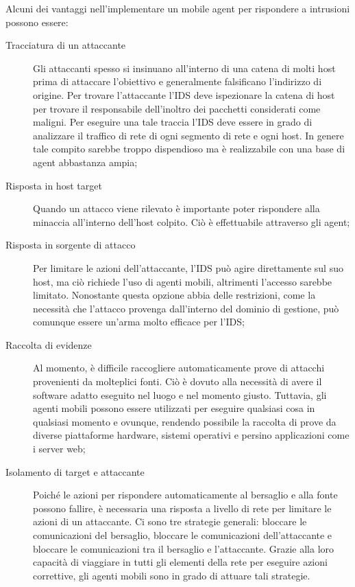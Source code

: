 Alcuni dei vantaggi nell'implementare un mobile agent per rispondere a intrusioni possono essere:
\begin{description}
    \item [Tracciatura di un attaccante] Gli attaccanti spesso si insinuano all'interno di una catena di molti host prima di attaccare l'obiettivo e generalmente falsificano l'indirizzo di origine. Per trovare l'attaccante l'IDS deve ispezionare la catena di host per trovare il responsabile dell'inoltro dei pacchetti considerati come maligni. Per eseguire una tale traccia l'IDS deve essere in grado di analizzare il traffico di rete di ogni segmento di rete e ogni host. In genere tale compito sarebbe troppo dispendioso ma è realizzabile  con una base di agent abbastanza ampia;
    \item [Risposta in host target] Quando un attacco viene rilevato è importante poter rispondere alla minaccia all'interno dell'host colpito. Ciò è effettuabile attraverso gli agent;
    \item [Risposta in sorgente di attacco] Per limitare le azioni dell'attaccante, l'IDS può agire direttamente sul suo host, ma ciò richiede l'uso di agenti mobili, altrimenti l'accesso sarebbe limitato. Nonostante questa opzione abbia delle restrizioni, come la necessità che l'attacco provenga dall'interno del dominio di gestione, può comunque essere un'arma molto efficace per l'IDS;
    \item [Raccolta di evidenze] Al momento, è difficile raccogliere automaticamente prove di attacchi provenienti da molteplici fonti. Ciò è dovuto alla necessità di avere il software adatto eseguito nel luogo e nel momento giusto. Tuttavia, gli agenti mobili possono essere utilizzati per eseguire qualsiasi cosa in qualsiasi momento e ovunque, rendendo possibile la raccolta di prove da diverse piattaforme hardware, sistemi operativi e persino applicazioni come i server web;
    \item[Isolamento di target e attaccante] Poiché le azioni per rispondere automaticamente al bersaglio e alla fonte possono fallire, è necessaria  una risposta a livello di rete per limitare le azioni di un attaccante. Ci sono tre strategie generali: bloccare le comunicazioni del bersaglio, bloccare le comunicazioni dell'attaccante e bloccare le comunicazioni tra il bersaglio e l'attaccante. Grazie alla loro capacità di viaggiare in tutti gli elementi della rete per eseguire azioni correttive, gli agenti mobili sono in grado di attuare tali strategie.
\end{description}

